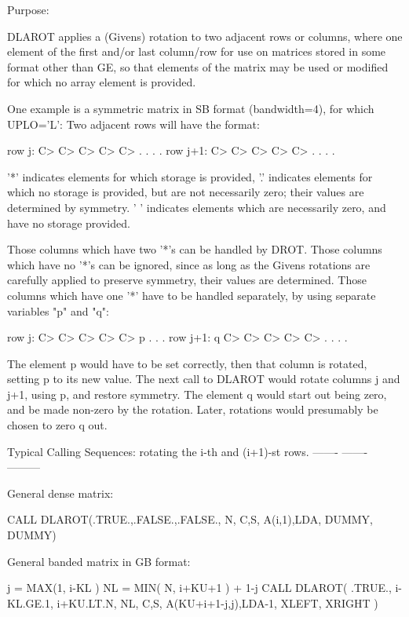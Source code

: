 \begin{DoxyParagraph}{Purpose\+: }
\begin{DoxyVerb}    DLAROT applies a (Givens) rotation to two adjacent rows or
    columns, where one element of the first and/or last column/row
    for use on matrices stored in some format other than GE, so
    that elements of the matrix may be used or modified for which
    no array element is provided.

    One example is a symmetric matrix in SB format (bandwidth=4), for
    which UPLO='L':  Two adjacent rows will have the format:

    row j:     C> C> C> C> C> .  .  .  .
    row j+1:      C> C> C> C> C> .  .  .  .

    '*' indicates elements for which storage is provided,
    '.' indicates elements for which no storage is provided, but
    are not necessarily zero; their values are determined by
    symmetry.  ' ' indicates elements which are necessarily zero,
     and have no storage provided.

    Those columns which have two '*'s can be handled by DROT.
    Those columns which have no '*'s can be ignored, since as long
    as the Givens rotations are carefully applied to preserve
    symmetry, their values are determined.
    Those columns which have one '*' have to be handled separately,
    by using separate variables "p" and "q":

    row j:     C> C> C> C> C> p  .  .  .
    row j+1:   q  C> C> C> C> C> .  .  .  .

    The element p would have to be set correctly, then that column
    is rotated, setting p to its new value.  The next call to
    DLAROT would rotate columns j and j+1, using p, and restore
    symmetry.  The element q would start out being zero, and be
    made non-zero by the rotation.  Later, rotations would presumably
    be chosen to zero q out.

    Typical Calling Sequences: rotating the i-th and (i+1)-st rows.
    ------- ------- ---------

      General dense matrix:

              CALL DLAROT(.TRUE.,.FALSE.,.FALSE., N, C,S,
                      A(i,1),LDA, DUMMY, DUMMY)

      General banded matrix in GB format:

              j = MAX(1, i-KL )
              NL = MIN( N, i+KU+1 ) + 1-j
              CALL DLAROT( .TRUE., i-KL.GE.1, i+KU.LT.N, NL, C,S,
                      A(KU+i+1-j,j),LDA-1, XLEFT, XRIGHT )


\end{DoxyVerb}
\end{DoxyParagraph}
